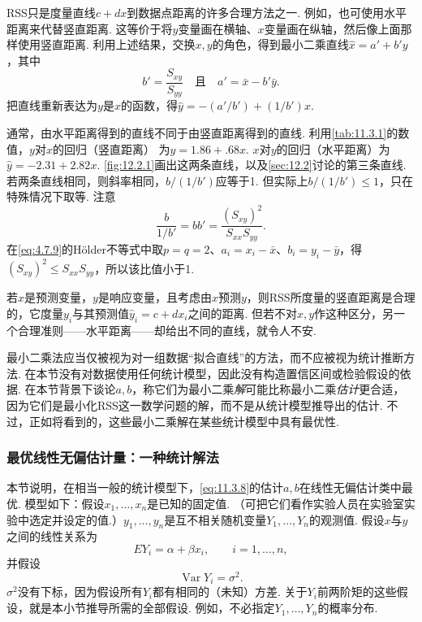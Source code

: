 RSS只是度量直线$c+dx$到数据点距离的许多合理方法之一. 例如，也可使用水平距离来代替竖直距离. 这等价于将$y$变量画在横轴、$x$变量画在纵轴，然后像上面那样使用竖直距离. 利用上述结果，交换$x,y$的角色，得到最小二乘直线$\hat x=a'+b'y$，其中
$$b'=\frac{S_{xy}}{S_{yy}}\quad\text{且}\quad a'=\bar x-b'\bar y.$$
把直线重新表达为$y$是$x$的函数，得$\hat y=-(a'/b')+(1/b')x$.

通常，由水平距离得到的直线不同于由竖直距离得到的直线. 利用\autoref{tab:11.3.1}的数值，$y$对$x$的回归（竖直距离）
为$\hat y=1.86+.68x$. $x$对$y$的回归（水平距离）为$\hat y=-2.31+2.82x$. \autoref{fig:12.2.1}画出这两条直线，以及\autoref{sec:12.2}讨论的第三条直线. 若两条直线相同，则斜率相同，$b/(1/b')$应等于1. 但实际上$b/(1/b')\le1$，只在特殊情况下取等. 注意
$$\frac{b}{1/b'}=bb'=\frac{(S_{xy})^2}{S_{xx}S_{yy}}.$$
在\eqref{eq:4.7.9}的H\"older不等式中取$p=q=2$、$a_i=x_i-\bar x$、$b_i=y_i-\bar y$，得$(S_{xy})^2\le S_{xx}S_{yy}$，所以该比值小于1.

若$x$是预测变量，$y$是响应变量，且考虑由$x$预测$y$，则RSS所度量的竖直距离是合理的，它度量$y_i$与其预测值$\hat y_i=c+dx_i$之间的距离. 但若不对$x,y$作这种区分，另一个合理准则——水平距离——却给出不同的直线，就令人不安.

最小二乘法应当仅被视为对一组数据“拟合直线”的方法，而不应被视为统计推断方法. 在本节没有对数据使用任何统计模型，因此没有构造置信区间或检验假设的依据. 在本节背景下谈论$a,b$，称它们为最小二乘\emph{解}可能比称最小二乘\emph{估计}更合适，因为它们是最小化RSS这一数学问题的解，而不是从统计模型推导出的估计. 不过，正如将看到的，这些最小二乘解在某些统计模型中具有最优性.

\subsubsection{最优线性无偏估计量：一种统计解法}\label{sec:11.3.2}
本节说明，在相当一般的统计模型下，\eqref{eq:11.3.8}的估计$a,b$在线性无偏估计类中最优. 模型如下：假设$x_1,\ldots,x_n$是已知的固定值. （可把它们看作实验人员在实验室实验中选定并设定的值.）$y_1,\ldots,y_n$是互不相关随机变量$Y_1,\ldots,Y_n$的观测值. 假设$x$与$y$之间的线性关系为
\begin{equation}\label{eq:11.3.11}
EY_i=\alpha+\beta x_i,\qquad i=1,\ldots,n,
\end{equation}
并假设
\begin{equation}\label{eq:11.3.12}
\operatorname{Var}Y_i=\sigma^2.
\end{equation}
$\sigma^2$没有下标，因为假设所有$Y_i$都有相同的（未知）方差. 关于$Y_i$前两阶矩的这些假设，就是本小节推导所需的全部假设. 例如，不必指定$Y_1,\ldots,Y_n$的概率分布.

